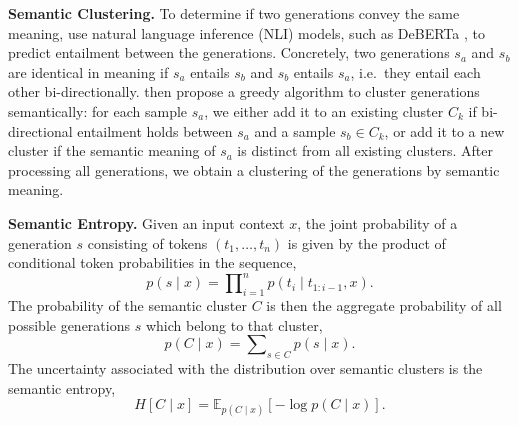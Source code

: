 \documentclass{article}
\begin{document}
\textbf{Semantic Clustering.} To determine if two generations convey the same meaning, \citet{farquhar2024detecting} use natural language inference (NLI) models, such as DeBERTa \citep{he2021deberta}, to predict entailment between the generations. Concretely, two generations $s_a$ and $s_b$ are identical in meaning if $s_a$ entails $s_b$ and $s_b$ entails $s_a$, i.e.~they entail each other bi-directionally. \citet{farquhar2024detecting} then propose a greedy algorithm to cluster generations semantically: for each sample $s_a$, we either add it to an existing cluster $C_k$ if bi-directional entailment holds between $s_a$ and a sample $s_b\in C_k$, or add it to a new cluster if the semantic meaning of $s_a$ is distinct from all existing clusters.
After processing all generations, we obtain a clustering of the generations by semantic meaning. 



\textbf{Semantic Entropy.}
Given an input context $x$, the joint probability of a generation $s$ consisting of tokens $(t_1, \dots, t_n)$ is given by the product of conditional token probabilities in the sequence,
\begin{equation}
p(s \mid x) = \prod\nolimits_{i=1}^{n} p(t_i \mid t_{1:i-1}, x).    
\end{equation}
The probability of the semantic cluster $C$ is then the aggregate probability of all possible generations $s$ which belong to that cluster,
\begin{equation}
p(C \mid x) = \sum\nolimits_{s \in C} p(s \mid x).    
\end{equation}
The uncertainty associated with the distribution over semantic clusters is the semantic entropy,
\begin{equation}
    H[C\mid x] = \mathbb{E}_{p(C\mid x)}[-\log p(C\mid x)]. 
\end{equation}
\end{document}
